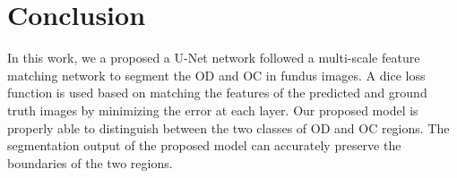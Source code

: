\documentclass[runningheads,a4paper]{llncs}
\begin{document}
\section{Conclusion}

In this work, we a proposed a U-Net network followed a multi-scale feature matching network to segment the OD and OC in fundus images. A dice loss function is used based on matching the features of the predicted and ground truth images by minimizing the error at each layer. Our proposed model is properly able to distinguish between the two classes of OD and OC regions. The segmentation output of the proposed model can accurately preserve the boundaries of the two regions.


 
\end{document}
